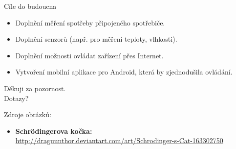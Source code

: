 \documentclass[11pt]{beamer}
\begin{document}
\begin{frame}{Cíle do budoucna}
  \begin{itemize}
    \item Doplnění měření spotřeby připojeného spotřebiče.
    \item Doplnění senzorů (např. pro měření teploty, vlhkosti).
    \item Doplnění možnosti ovládat zařízení přes Internet.
    \item Vytvoření mobilní aplikace pro Android, která by zjednodušila ovládání.
  \end{itemize}
\end{frame}

\begin{frame}
  \begin{center}
    \huge{Děkuji za pozornost.} \\[8mm]
    \large{Dotazy?}
  \end{center}
  \vspace{32mm}
  Zdroje obrázků:
  \begin{itemize}
    \item[] \hspace{-5mm} \tiny{\textbf{Schrödingerova kočka:} \url{http://draguunthor.deviantart.com/art/Schrodinger-s-Cat-163302750}}
  \end{itemize}
\end{frame}
\end{document}
